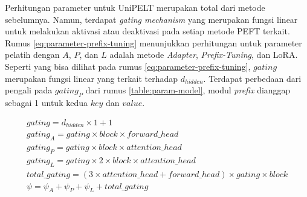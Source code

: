 Perhitungan parameter untuk UniPELT merupakan total dari metode sebelumnya. Namun, terdapat \textit{gating mechanism} yang merupakan fungsi linear untuk melakukan aktivasi atau deaktivasi pada setiap metode PEFT terkait. Rumus \ref{eq:parameter-prefix-tuning} menunjukkan perhitungan untuk parameter pelatih dengan $A$, $P$, dan $L$ adalah metode \textit{Adapter}, \textit{Prefix-Tuning}, dan LoRA. Seperti yang bisa dilihat pada rumus \ref{eq:parameter-prefix-tuning}, $gating$ merupakan fungsi linear yang terkait terhadap $d_{hidden}$. Terdapat perbedaan dari pengali pada $gating_{P}$ dari rumus \ref{table:param-model}, modul \textit{prefix} dianggap sebagai 1 untuk kedua $key$ dan $value$.

\begin{equation}
    \begin{aligned}
        gating = d_{hidden} \times 1 + 1 \\
        gating_{A} = gating \times block \times forward\_head \\
        gating_{P} = gating \times block \times attention\_head \\
        gating_{L} = gating \times 2 \times block \times attention\_head \\
        total\_gating = (3 \times attention\_head + forward\_head) \times gating \times block \\
        \psi = \psi_A + \psi_P + \psi_L + total\_gating
    \end{aligned}
    \label{eq:parameter-unipelt}
\end{equation}

